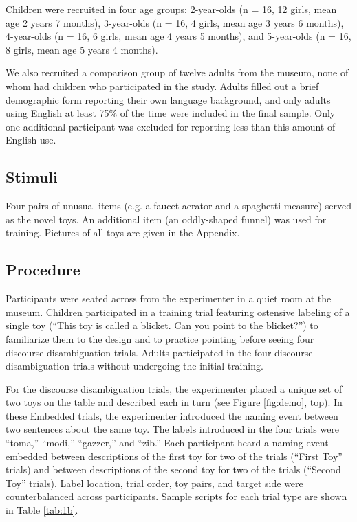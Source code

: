 \documentclass[man]{apa2}
\begin{document}
Children were recruited in four age groups: 2-year-olds (n = 16, 12 girls, mean age 2 years 7 months), 3-year-olds (n = 16, 4 girls, mean age 3 years 6 months), 4-year-olds (n = 16, 6 girls, mean age 4 years 5 months), and 5-year-olds (n = 16, 8 girls, mean age 5 years 4 months).  

We also recruited a comparison group of twelve adults from the museum, none of whom had children who participated in the study. Adults filled out a brief demographic form reporting their own language background, and only adults using English at least 75\% of the time were included in the final sample. Only one additional participant was excluded for reporting less than this amount of English use.  


\subsection{Stimuli}

Four pairs of unusual items (e.g. a faucet aerator and a spaghetti measure) served as the novel toys.  An additional item (an oddly-shaped funnel) was used for training. Pictures of all toys are given in the Appendix.

\subsection{Procedure}

Participants were seated across from the experimenter in a quiet room at the museum.  Children participated in a training trial featuring ostensive labeling of a single toy (``This toy is called a blicket.  Can you point to the blicket?'') to familiarize them to the design and to practice pointing before seeing four discourse disambiguation trials.  Adults participated in the four discourse disambiguation trials without undergoing the initial training. 

For the discourse disambiguation trials, the experimenter placed a unique set of two toys on the table and described each in turn (see Figure \ref{fig:demo}, top).  In these Embedded trials, the experimenter introduced the naming event between two sentences about the same toy.  The labels introduced in the four trials were ``toma,'' ``modi,'' ``gazzer,'' and ``zib.''  Each participant heard a naming event embedded between descriptions of the first toy for two of the trials (``First Toy'' trials) and between descriptions of the second toy for two of the trials (``Second Toy'' trials).  Label location, trial order, toy pairs, and target side were counterbalanced across participants.  Sample scripts for each trial type are shown in Table \ref{tab:1b}.  
\end{document}
